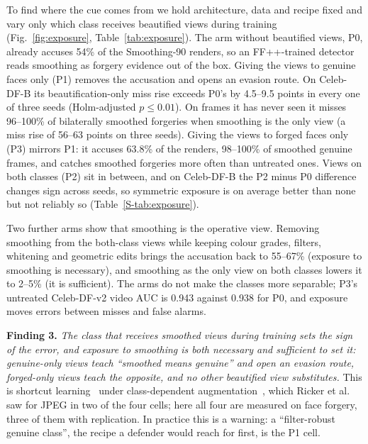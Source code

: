 \documentclass[journal]{IEEEtran}  %
\begin{document}
To find where the cue comes from we hold architecture, data and recipe fixed and vary only which class receives beautified
views during training (Fig.~\ref{fig:exposure}, Table~\ref{tab:exposure}). The arm without beautified views, P0, already
accuses 54\% of the Smoothing-90 renders, so an FF++-trained detector reads smoothing as forgery evidence out of the box.
Giving the views to genuine faces only (P1) removes the accusation and opens an evasion route. On Celeb-DF-B its
beautification-only miss rise exceeds P0's by 4.5--9.5 points in every one of three seeds (Holm-adjusted $p\le0.01$).
On frames it has never seen it misses 96--100\% of bilaterally smoothed forgeries when smoothing is the only view
(a miss rise of 56--63 points on three seeds).
Giving the views to forged faces only (P3) mirrors P1: it accuses 63.8\% of the renders, 98--100\% of smoothed genuine
frames, and catches smoothed forgeries more often than untreated ones.
Views on both classes (P2) sit in between, and on Celeb-DF-B the P2 minus P0 difference changes sign across seeds, so
symmetric exposure is on average better than none but not reliably so (Table~\ref{S-tab:exposure}).

Two further arms show that smoothing is the operative view. Removing smoothing from the both-class views while keeping colour
grades, filters, whitening and geometric edits brings the accusation back to 55--67\%
(exposure to smoothing is necessary), and smoothing as the only view on both classes lowers it to 2--5\%
(it is sufficient). The arms do not make the classes more separable; P3's untreated Celeb-DF-v2 video AUC is 0.943 against
0.938 for P0, and exposure moves errors between misses and false alarms.

\textbf{Finding 3.} \emph{The class that receives smoothed views during training sets the sign of the error, and exposure
to smoothing is both necessary and sufficient to set it: genuine-only views teach ``smoothed means genuine'' and open an
evasion route, forged-only views teach the opposite, and no other beautified view substitutes.} This is shortcut
learning~\cite{geirhos2020} under class-dependent augmentation~\cite{balestriero2022}, which Ricker et
al.~\cite{ricker2026biasid} saw for JPEG in two of the four cells; here all four are measured on face forgery, three of
them with replication. In practice this is a warning: a ``filter-robust genuine class'', the recipe a defender would
reach for first, is the P1 cell.
\end{document}
